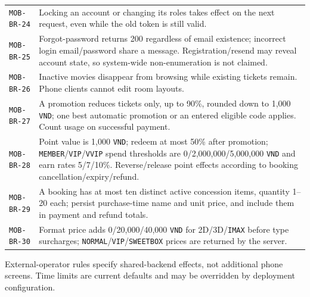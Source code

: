 \begin{longtable}{@{}P{0.23000\SRSWidth}P{0.77000\SRSWidth}@{}}
\texttt{MOB-\allowbreak{}BR-\allowbreak{}24} & Locking an account or changing its roles takes effect on the next request, even while the old token is still valid. \\[3pt]
\texttt{MOB-\allowbreak{}BR-\allowbreak{}25} & Forgot-password returns 200 regardless of email existence; incorrect login email/\allowbreak{}password share a message. Registration/\allowbreak{}resend may reveal account state, so system-wide non-enumeration is not claimed. \\[3pt]
\texttt{MOB-\allowbreak{}BR-\allowbreak{}26} & Inactive movies disappear from browsing while existing tickets remain. Phone clients cannot edit room layouts. \\[3pt]
\texttt{MOB-\allowbreak{}BR-\allowbreak{}27} & A promotion reduces tickets only, up to 90\%, rounded down to 1,000 \texttt{VND}; one best automatic promotion or an entered eligible code applies. Count usage on successful payment. \\[3pt]
\texttt{MOB-\allowbreak{}BR-\allowbreak{}28} & Point value is 1,000 \texttt{VND}; redeem at most 50\% after promotion; \texttt{MEMBER}/\allowbreak{}\texttt{VIP}/\allowbreak{}\texttt{VVIP} spend thresholds are 0/\allowbreak{}2,000,000/\allowbreak{}5,000,000 \texttt{VND} and earn rates 5/\allowbreak{}7/\allowbreak{}10\%. Reverse/\allowbreak{}release point effects according to booking cancellation/\allowbreak{}expiry/\allowbreak{}refund. \\[3pt]
\texttt{MOB-\allowbreak{}BR-\allowbreak{}29} & A booking has at most ten distinct active concession items, quantity 1–20 each; persist purchase-time name and unit price, and include them in payment and refund totals. \\[3pt]
\texttt{MOB-\allowbreak{}BR-\allowbreak{}30} & Format price adds 0/\allowbreak{}20,000/\allowbreak{}40,000 \texttt{VND} for 2D/\allowbreak{}3D/\allowbreak{}\texttt{IMAX} before type surcharges; \texttt{NORMAL}/\allowbreak{}\texttt{VIP}/\allowbreak{}\texttt{SWEETBOX\allowbreak{}} prices are returned by the server. \\[3pt]
\end{longtable}
\endgroup

External-operator rules specify shared-backend effects, not additional phone screens. Time limits are current defaults and may be overridden by deployment configuration.
